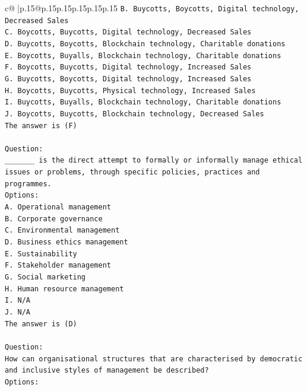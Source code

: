\documentclass{article}
\begin{document}
{\begin{supertabular}{c@{$\;$}|p{.15\linewidth}@{}p{.15\linewidth}p{.15\linewidth}p{.15\linewidth}p{.15\linewidth}p{.15\linewidth}}
{{{\texttt{B. Buycotts, Boycotts, Digital technology, Decreased Sales} \\
\texttt{C. Boycotts, Buycotts, Digital technology, Decreased Sales} \\
\texttt{D. Buycotts, Boycotts, Blockchain technology, Charitable donations} \\
\texttt{E. Boycotts, Buyalls, Blockchain technology, Charitable donations} \\
\texttt{F. Boycotts, Buycotts, Digital technology, Increased Sales} \\
\texttt{G. Buycotts, Boycotts, Digital technology, Increased Sales} \\
\texttt{H. Boycotts, Buycotts, Physical technology, Increased Sales} \\
\texttt{I. Buycotts, Buyalls, Blockchain technology, Charitable donations} \\
\texttt{J. Boycotts, Buycotts, Blockchain technology, Decreased Sales} \\
\texttt{The answer is (F)} \\
\\ 
\texttt{Question:} \\
\texttt{\_\_\_\_\_\_\_ is the direct attempt to formally or informally manage ethical issues or problems, through specific policies, practices and programmes.} \\
\texttt{Options:} \\
\texttt{A. Operational management} \\
\texttt{B. Corporate governance} \\
\texttt{C. Environmental management} \\
\texttt{D. Business ethics management} \\
\texttt{E. Sustainability} \\
\texttt{F. Stakeholder management} \\
\texttt{G. Social marketing} \\
\texttt{H. Human resource management} \\
\texttt{I. N/A} \\
\texttt{J. N/A} \\
\texttt{The answer is (D)} \\
\\ 
\texttt{Question:} \\
\texttt{How can organisational structures that are characterised by democratic and inclusive styles of management be described?} \\
\texttt{Options:} \\
}}}
\end{supertabular}}
\end{document}
